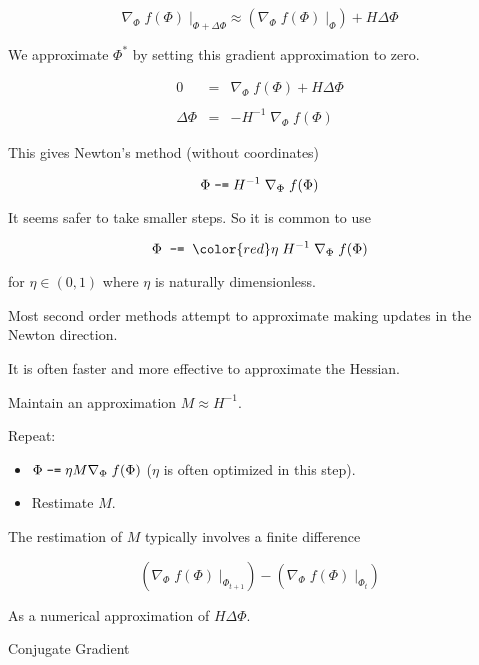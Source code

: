 {$$\nabla_\Phi\; f(\Phi)\; |_{\Phi + \Delta \Phi}\approx \left(\nabla _\Phi \;f(\Phi)\; |_{\Phi}\right) + H \Delta \Phi$$

\vfill
We approximate $\Phi^*$ by setting this gradient approximation to zero.

\vfill
\begin{eqnarray*}
  0 & = & \nabla _\Phi\; f(\Phi) + H \Delta \Phi \\
  \\
\Delta \Phi & = & - H^{-1} \;\nabla _\Phi \; f(\Phi)
\end{eqnarray*}

\vfill
This gives Newton's method (without coordinates)

\vfill
{\color{red} $$\Phi \;\mbox{\tt -=} \; H^{-1}\; \nabla_\Phi \;f(\Phi)$$}


It seems safer to take smaller steps.  So it is common to use

\vfill
$$\Phi\;\;\minuseq \;\; {\color{red} \eta}\; H^{-1}\;\nabla_\Phi\; f(\Phi)$$

\vfill
for $\eta \in (0,1)$ where $\eta$ is naturally dimensionless.

\vfill
Most second order methods attempt to approximate making updates in the Newton direction.


It is often faster and more effective to approximate the Hessian.

\vfill
Maintain an approximation $M \approx H^{-1}$.

\vfill
Repeat:

\vfill
\begin{itemize}
\item $\Phi \;\mbox{\tt -=} \; \eta M \nabla_\Phi \;f(\Phi)$ ($\eta$ is often optimized in this step).

\vfill
\item Restimate $M$.
\end{itemize}

\vfill
The restimation of $M$ typically involves a finite difference

\vfill
$$\left(\nabla_\Phi \;f(\Phi)\;|_{\Phi_{t+1}}\right) - \left(\nabla_\Phi \;f(\Phi)\;|_{\Phi_t}\right)$$

\vfill
As a numerical approximation of $H \Delta \Phi$.


Conjugate Gradient

}
